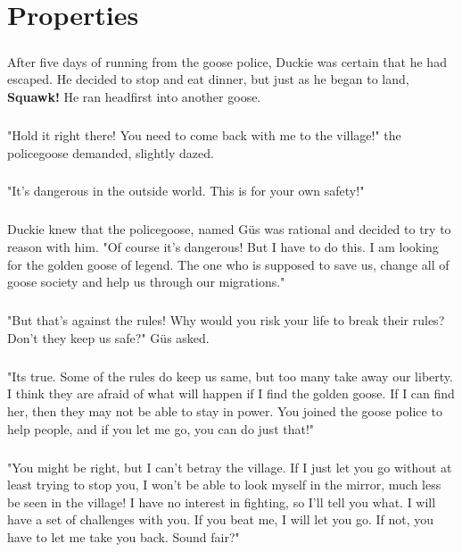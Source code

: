 \chapter{Properties}
\paragraph{} After five days of running from the goose police, Duckie was certain that he had escaped. He decided to stop and eat dinner, but just as he began to land, \textbf{Squawk!} He ran headfirst into another goose. 
\paragraph{} "Hold it right there! You need to come back with me to the village!" the policegoose demanded, slightly dazed. 
\paragraph{} "It's dangerous in the outside world. This is for your own safety!"
\paragraph{} Duckie knew that the policegoose, named G{\"u}s was rational and decided to try to reason with him. "Of course it's dangerous! But I have to do this. I am looking for the golden goose of legend. The one who is supposed to save us, change all of goose society and help us through our migrations."
\paragraph{} "But that's against the rules! Why would you risk your life to break their rules? Don't they keep us safe?" G{\"u}s asked.
\paragraph{} "Its true. Some of the rules do keep us same, but too many take away our liberty. I think they are afraid of what will happen if I find the golden goose. If I can find her, then they may not be able to stay in power. You joined the goose police to help people, and if you let me go, you can do just that!"
\paragraph{} "You might be right, but I can't betray the village. If I just let you go without at least trying to stop you, I won't be able to look myself in the mirror, much less be seen in the village! I have no interest in fighting, so I'll tell you what. I will have a set of challenges with you. If you beat me, I will let you go. If not, you have to let me take you back. Sound fair?"
